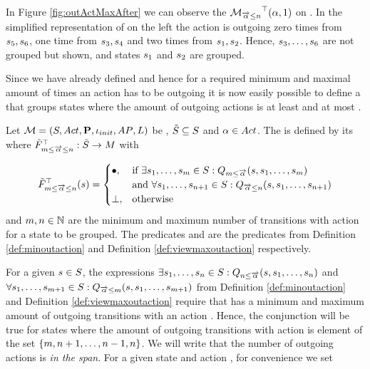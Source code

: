 \documentclass[preview]{standalone}
\begin{document}
\pagebreak

\begin{exmp}
	In Figure \ref{fig:outActMaxAfter} we can observe the \viewN $\viewmaxoutaction(\action,1)$ on \chgph. In the simplified representation of \achgphN on the left the action \action is outgoing zero times from $\state_5, \state_6$, one time from $\state_3, \state_4$ and two times from $\state_1, \state_2$. Hence, $\state_3, \dots, \state_6$ are not grouped but shown, and states $\state_1$ and $\state_2$ are grouped.
\end{exmp}

Since we have already defined \grpfctsN and hence \viewsN for a required minimum and maximal amount of times an action has to be outgoing it is now easily possible to define a \viewN that groups states where the amount of outgoing actions is at least \numoutact and at most \numoutactb. 

\begin{definition}
	Let $\chgph = \chgphtuple$ be \achgphN, $\smstates \subseteq \states$ and $\action \in \actions$. The \viewN 
	\viewspanoutaction is defined by its \grpfctN where $\gfctsubspanoutaction : \smstates \to \imggrp$ with

	\[
	\gfctsubspanoutaction(\state) =
	\begin{cases}
			\remelem,				& \text{if } \exists \state_1, \dots, \state_\numoutactb \in \states: \predminoutact[\numoutactb] \\ &\text{and } \forall \state_1, \dots, \state_{\numoutact+1} \in \states: \predmaxoutact \\
			\notppty,     	& \text{otherwise}
		\end{cases}
	\]
	and $\numoutactb, \numoutact \in \natnums$ are the minimum and maximum number of transitions with action \action for a state to be grouped. The predicates \predminoutact and \predmaxoutact are the predicates from Definition \ref{def:minoutaction} and Definition \ref{def:viewmaxoutaction} respectively.
\end{definition}

For a given $\state \in \states$, the expressions $\exists \state_1, \dots, \state_\numoutact \in \states: \predminoutact$ and $\forall \state_1, \dots, \state_{\numoutactb+1} \in \states: \predmaxoutact[\numoutactb]$ from Definition \ref{def:minoutaction} and Definition \ref{def:viewmaxoutaction} require that \state has a minimum and maximum amount of outgoing transitions with an action \action. Hence, the conjunction will be true for states where the amount of outgoing transitions with action \action is element of the set $\{\numoutactb, \numoutact+1, \dots, \numoutact-1, \numoutact\}$. We will write that the number of outgoing actions is \emph{in the span}. For a given state \state and action \action, for convenience we set
\end{document}

